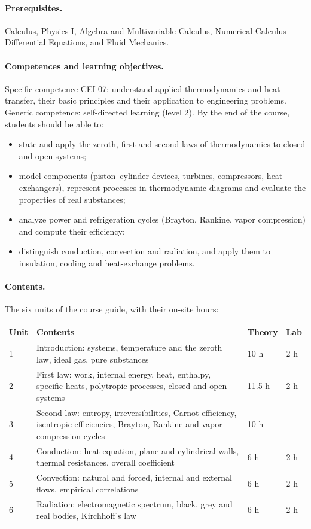 \documentclass[11pt]{article}
\begin{document}
\paragraph{Prerequisites.} Calculus, Physics I, Algebra and Multivariable Calculus,
Numerical Calculus -- Differential Equations, and Fluid Mechanics.

\paragraph{Competences and learning objectives.} Specific competence CEI-07: understand
applied thermodynamics and heat transfer, their basic principles and their application to
engineering problems. Generic competence: self-directed learning (level 2). By the end of
the course, students should be able to:
\begin{itemize}
  \item state and apply the zeroth, first and second laws of thermodynamics to closed and
  open systems;
  \item model components (piston--cylinder devices, turbines, compressors, heat
  exchangers), represent processes in thermodynamic diagrams and evaluate the properties of
  real substances;
  \item analyze power and refrigeration cycles (Brayton, Rankine, vapor compression) and
  compute their efficiency;
  \item distinguish conduction, convection and radiation, and apply them to insulation,
  cooling and heat-exchange problems.
\end{itemize}

\paragraph{Contents.} The six units of the course guide, with their on-site hours:
\begin{center}\small
\begin{tabularx}{\textwidth}{@{}p{0.6cm}Xp{1.3cm}p{1.2cm}@{}}
\toprule
\textbf{Unit} & \textbf{Contents} & \textbf{Theory} & \textbf{Lab} \\
\midrule
1 & Introduction: systems, temperature and the zeroth law, ideal gas, pure substances & 10 h & 2 h \\
2 & First law: work, internal energy, heat, enthalpy, specific heats, polytropic processes, closed and open systems & 11.5 h & 2 h \\
3 & Second law: entropy, irreversibilities, Carnot efficiency, isentropic efficiencies, Brayton, Rankine and vapor-compression cycles & 10 h & -- \\
4 & Conduction: heat equation, plane and cylindrical walls, thermal resistances, overall coefficient & 6 h & 2 h \\
5 & Convection: natural and forced, internal and external flows, empirical correlations & 6 h & 2 h \\
6 & Radiation: electromagnetic spectrum, black, grey and real bodies, Kirchhoff's law & 6 h & 2 h \\
\bottomrule
\end{tabularx}
\end{center}
\end{document}

